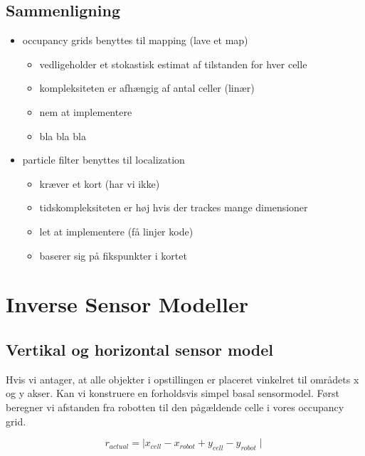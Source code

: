 \subsection{Sammenligning}
\begin{itemize}

\item occupancy grids benyttes til mapping (lave et map)
	\begin{itemize}
	\item vedligeholder et stokastisk estimat af tilstanden for hver celle
	\item kompleksiteten er afhængig af antal celler (linær)
	\item nem at implementere
	\item bla bla bla
	\end{itemize}
	
\item particle filter benyttes til localization
	\begin{itemize}
	\item kræver et kort (har vi ikke)
	\item tidskompleksiteten er høj hvis der trackes mange dimensioner
	\item let at implementere (få linjer kode)
	\item baserer sig på fikspunkter i kortet
	\end{itemize}

\end{itemize}



\section{Inverse Sensor Modeller}


\subsection{Vertikal og horizontal sensor model}

Hvis vi antager, at alle objekter i opstillingen er placeret vinkelret til områdets x og y akser.
Kan vi konstruere en forholdsvis simpel basal sensormodel.
Først beregner vi afstanden fra robotten til den pågældende celle i vores occupancy grid.

$$r_{actual} = \mid x_{cell} - x_{robot} + y_{cell} - y_{robot} \mid$$

